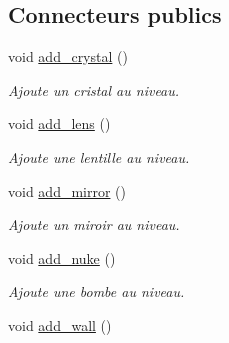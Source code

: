\subsection*{Connecteurs publics}
\begin{DoxyCompactItemize}
\item 
\hypertarget{classMainEditor_a11c01691ed4e4385c40ded07b2a4044e}{void \hyperlink{classMainEditor_a11c01691ed4e4385c40ded07b2a4044e}{add\+\_\+crystal} ()}\label{classMainEditor_a11c01691ed4e4385c40ded07b2a4044e}

\begin{DoxyCompactList}\small\item\em Ajoute un cristal au niveau. \end{DoxyCompactList}\item 
\hypertarget{classMainEditor_a9cc5457b86afb73a672f12d8915082c7}{void \hyperlink{classMainEditor_a9cc5457b86afb73a672f12d8915082c7}{add\+\_\+lens} ()}\label{classMainEditor_a9cc5457b86afb73a672f12d8915082c7}

\begin{DoxyCompactList}\small\item\em Ajoute une lentille au niveau. \end{DoxyCompactList}\item 
\hypertarget{classMainEditor_a3ea0d26648a2a91f4c51fd78d06c4bd7}{void \hyperlink{classMainEditor_a3ea0d26648a2a91f4c51fd78d06c4bd7}{add\+\_\+mirror} ()}\label{classMainEditor_a3ea0d26648a2a91f4c51fd78d06c4bd7}

\begin{DoxyCompactList}\small\item\em Ajoute un miroir au niveau. \end{DoxyCompactList}\item 
\hypertarget{classMainEditor_ac1563d2cb8788295cea11a3d4f668f1e}{void \hyperlink{classMainEditor_ac1563d2cb8788295cea11a3d4f668f1e}{add\+\_\+nuke} ()}\label{classMainEditor_ac1563d2cb8788295cea11a3d4f668f1e}

\begin{DoxyCompactList}\small\item\em Ajoute une bombe au niveau. \end{DoxyCompactList}\item 
\hypertarget{classMainEditor_a2212ba27b33fa70c0b45e3d58d784c1e}{void \hyperlink{classMainEditor_a2212ba27b33fa70c0b45e3d58d784c1e}{add\+\_\+wall} ()}\label{classMainEditor_a2212ba27b33fa70c0b45e3d58d784c1e}


\end{DoxyCompactItemize}
